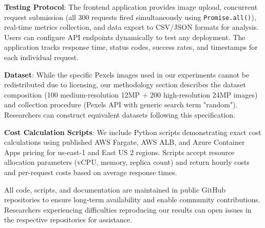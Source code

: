 \textbf{Testing Protocol}: The frontend application provides image upload, concurrent request submission (all 300 requests fired simultaneously using \texttt{Promise.all()}), real-time metrics collection, and data export to CSV/JSON formats for analysis. Users can configure API endpoints dynamically to test any deployment. The application tracks response time, status codes, success rates, and timestamps for each individual request.

\textbf{Dataset}: While the specific Pexels images used in our experiments cannot be redistributed due to licensing, our methodology section describes the dataset composition (100 medium-resolution 12MP + 200 high-resolution 24MP images) and collection procedure (Pexels API with generic search term "random"). Researchers can construct equivalent datasets following this specification.

\textbf{Cost Calculation Scripts}: We include Python scripts demonstrating exact cost calculations using published AWS Fargate, AWS ALB, and Azure Container Apps pricing for us-east-1 and East US 2 regions. Scripts accept resource allocation parameters (vCPU, memory, replica count) and return hourly costs and per-request costs based on average response times.

All code, scripts, and documentation are maintained in public GitHub repositories to ensure long-term availability and enable community contributions. Researchers experiencing difficulties reproducing our results can open issues in the respective repositories for assistance.
